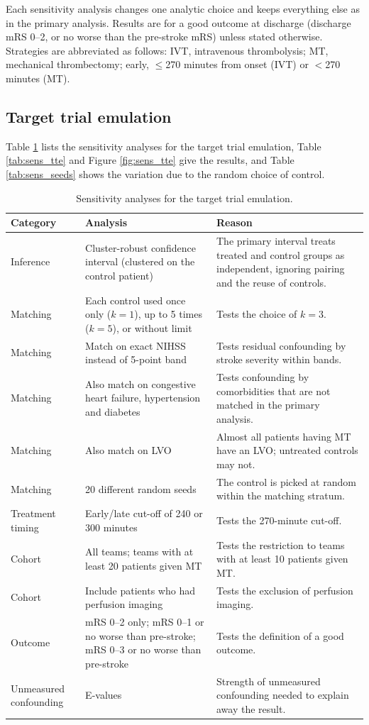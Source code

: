 Each sensitivity analysis changes one analytic choice and keeps everything else as in the primary analysis. Results are for a good outcome at discharge (discharge mRS 0--2, or no worse than the pre-stroke mRS) unless stated otherwise. Strategies are abbreviated as follows: IVT, intravenous thrombolysis; MT, mechanical thrombectomy; early, $\leq$270 minutes from onset (IVT) or $<$270 minutes (MT).

\subsection{Target trial emulation}

Table \ref{tab:sens_analyses_tte} lists the sensitivity analyses for the target trial emulation, Table \ref{tab:sens_tte} and Figure \ref{fig:sens_tte} give the results, and Table \ref{tab:sens_seeds} shows the variation due to the random choice of control.

\begin{table}[htbp]
\centering
\footnotesize
\caption{Sensitivity analyses for the target trial emulation.}
\label{tab:sens_analyses_tte}
\begin{tabular}{@{}p{}p{}p{}@{}}
\toprule
Category & Analysis & Reason \\
\midrule
Inference & Cluster-robust confidence interval (clustered on the control patient) & The primary interval treats treated and control groups as independent, ignoring pairing and the reuse of controls. \\
Matching & Each control used once only ($k=1$), up to 5 times ($k=5$), or without limit & Tests the choice of $k=3$. \\
Matching & Match on exact NIHSS instead of 5-point band & Tests residual confounding by stroke severity within bands. \\
Matching & Also match on congestive heart failure, hypertension and diabetes & Tests confounding by comorbidities that are not matched in the primary analysis. \\
Matching & Also match on LVO & Almost all patients having MT have an LVO; untreated controls may not. \\
Matching & 20 different random seeds & The control is picked at random within the matching stratum. \\
Treatment timing & Early/late cut-off of 240 or 300 minutes & Tests the 270-minute cut-off. \\
Cohort & All teams; teams with at least 20 patients given MT & Tests the restriction to teams with at least 10 patients given MT. \\
Cohort & Include patients who had perfusion imaging & Tests the exclusion of perfusion imaging. \\
Outcome & mRS 0--2 only; mRS 0--1 or no worse than pre-stroke; mRS 0--3 or no worse than pre-stroke & Tests the definition of a good outcome. \\
Unmeasured confounding & E-values & Strength of unmeasured confounding needed to explain away the result. \\
\bottomrule
\end{tabular}
\end{table}

